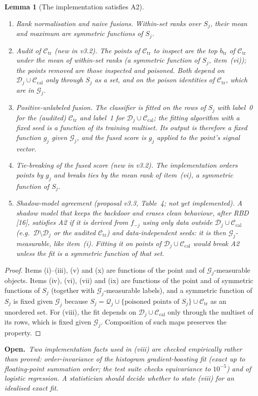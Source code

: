 \documentclass[11pt]{article}
\newtheorem{lemma}{Lemma}
\theoremstyle{definition}
\theoremstyle{remark}
\newcommand{\Cal}{\mathcal{C}_{\mathrm{cal}}}
\newcommand{\Ctr}{\mathcal{C}_{\mathrm{tr}}}
\newcommand{\D}{\mathcal{D}}
\newcommand{\G}{\mathcal{G}}
\newcommand{\Q}{\mathcal{Q}}
\newcommand{\1}{\mathbf{1}}
\newcommand{\todo}[1]{\par\noindent\textbf{Open.}~\emph{#1}\par}
\begin{document}
\begin{lemma}[The implementation satisfies A2]
\begin{enumerate}[label=(\roman*),leftmargin=*]
\item \emph{Rank normalisation and naive fusions.} Within-set ranks over $S_j$, their mean and
  maximum are symmetric functions of $S_j$.
\item \emph{Audit of $\Ctr$ (new in v3.2).} The points of $\Ctr$ to inspect are the top
  $b_{\mathrm{tr}}$ of $\Ctr$ under the mean of within-set ranks (a symmetric function of $S_j$,
  item~(vi)); the points removed are those inspected and poisoned. Both depend on $\D_j\cup\Cal$
  only through $S_j$ as a set, and on the poison identities of $\Ctr$, which are in $\G_j$.
\item \emph{Positive-unlabeled fusion.} The classifier is fitted on the rows of $S_j$ with
  label~0 for the (audited) $\Ctr$ and label~1 for $\D_j\cup\Cal$; the fitting algorithm with a
  fixed seed is a function of its training \emph{multiset}. Its output is therefore a fixed
  function $g_j$ given $\G_j$, and the fused score is $g_j$ applied to the point's signal vector.
\item \emph{Tie-breaking of the fused score (new in v3.2).} The implementation orders points by
  $g_j$ and breaks ties by the mean rank of item~(vi), a symmetric function of $S_j$.
\item \emph{Shadow-model agreement (proposal v3.3, Table~4; not yet implemented).} A shadow model
  that keeps the backdoor and erases clean behaviour, after RBD [16], satisfies A2 if it is derived
  from $f_{-j}$ using only data outside $\D_j\cup\Cal$ (e.g.\ $\D\setminus\D_j$ or the audited
  $\Ctr$) and data-independent seeds: it is then $\G_j$-measurable, like item~(i). Fitting it on
  points of $\D_j\cup\Cal$ would break A2 unless the fit is a symmetric function of that set.
\end{enumerate}
\end{lemma}

\begin{proof}
Items (i)--(iii), (v) and (x) are functions of the point and of $\G_j$-measurable objects. Items
(iv), (vi), (vii) and (ix) are functions of the point and of symmetric functions of $S_j$
(together with $\G_j$-measurable labels), and a symmetric function of $S_j$ is fixed given $\G_j$
because $S_j=\Q_j\cup\{\text{poisoned points of }S_j\}\cup\Ctr$ as an unordered set. For (viii),
the fit depends on $\D_j\cup\Cal$ only through the multiset of its rows, which is fixed given
$\G_j$. Composition of such maps preserves the property.
\end{proof}

\todo{Two implementation facts used in (viii) are checked empirically rather than proved:
order-invariance of the histogram gradient-boosting fit (exact up to floating-point summation
order; the test suite checks equivariance to $10^{-5}$) and of logistic regression. A statistician should decide whether to state (viii) for an idealised exact fit.}
\end{document}
